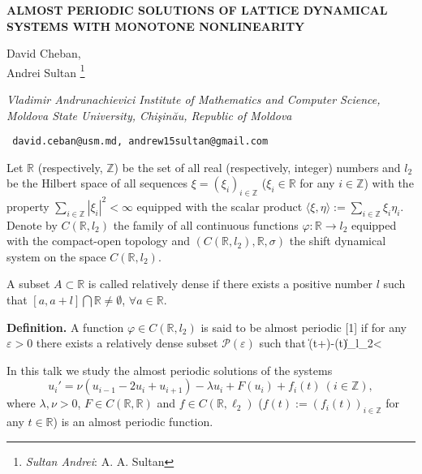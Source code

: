\documentclass[10pt,a4paper]{article}
\newcommand{\titleart}[1]{\bigskip\begin{center}\large
\textbf{#1}\end{center}\vspace{-6mm}}
\newcommand{\autorart}[1]{\begin{center}\large
\textsf{#1}\end{center} \vspace{-6mm}}
\newcommand{\coord}[1]{\begin{center} \small
\textit{#1}\end{center} \vspace{-6mm}}
\newcommand{\mail}[1]{\begin{center} \small
\texttt{#1}\end{center} \normalsize}
\begin{document}
\titleart{ALMOST PERIODIC SOLUTIONS OF LATTICE DYNAMICAL SYSTEMS WITH MONOTONE NONLINEARITY}

\autorart{David Cheban\index{Cheban D. N.},\\
         Andrei Sultan\index{Sultan A. A.}
\footnote{{\it Sultan Andrei}: A. A.
Sultan}}

\coord{Vladimir Andrunachievici Institute of Mathematics and
Computer Science, Moldova State University, Chi\c{s}in\u{a}u,
Republic of Moldova}

\mail{ david.ceban@usm.md, andrew15sultan@gmail.com}


\medskip



Let $\mathbb R$ (respectively, $\mathbb Z$) be the set of all real
(respectively, integer) numbers and $l_{2}$ be the Hilbert space of
all sequences $\xi =(\xi_{i})_{i\in\mathbb Z}$ ($\xi_{i}\in
\mathbb R$ for any $i\in \mathbb Z$) with the property
$\sum\limits_{i\in \mathbb Z}|\xi_{i}|^{2}<\infty$ equipped with
the scalar product $\langle \xi,\eta\rangle :=\sum\limits_{i\in
\mathbb Z}\xi_{i}\eta_{i}$. Denote by $C(\mathbb R,l_{2})$ the
family of all continuous functions $\varphi :\mathbb R\to l_{2}$
equipped with the compact-open topology and $(C(\mathbb
R,l_{2}),\mathbb R,\sigma)$ the shift dynamical system on the
space $C(\mathbb R,l_{2})$.

A subset $A\subset \mathbb R$ is called relatively dense if there
exists a positive number $l$ such that $[a,a+l]\bigcap \mathbb R
\not= \emptyset$, \(\forall a \in \mathbb R\).

\textbf{Definition.} A function $\varphi\in C(\mathbb R,l_{2})$ is
said to be almost periodic [1] if for any $\varepsilon
>0$ there exists a relatively dense subset $\mathcal
P(\varepsilon)$ such that
\|\varphi(t+\tau)-\varphi(t)\|_{l_{2}}<\varepsilon

In this talk we study the almost periodic solutions of the systems
\begin{equation}\label{eqI1}
u_{i}'=\nu (u_{i-1}-2u_i+u_{i+1})-\lambda u_{i}+F(u_i)+f_{i}(t)\
(i\in \mathbb Z),
\end{equation}
where $\lambda, \nu >0$, $F\in C(\mathbb R, \mathbb R)$ and $f\in
C(\mathbb R,\ell_{2})$ ($f(t):=(f_{i}(t))_{i\in \mathbb Z}$ for
any $t\in \mathbb R$) is an almost periodic function.
\end{document}
